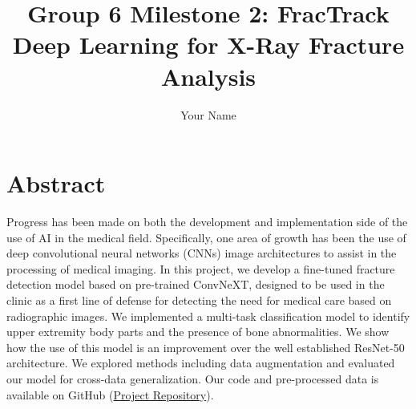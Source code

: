\documentclass[conference]{IEEEtran}
\begin{document}
\title{Group 6 Milestone 2: FracTrack\\[0.5em] 
       \large Deep Learning for X-Ray Fracture Analysis}
\author{Your Name}
\author{
\and
{}
\and
{}
\and
{}
}

\maketitle

\section{Abstract}
Progress has been made on both the development and implementation side of the use of AI in the medical field. Specifically, one area of growth has been the use of deep convolutional neural networks (CNNs) image architectures to assist in the processing of medical imaging. In this project, we develop a fine-tuned fracture detection model based on pre-trained ConvNeXT, designed to be used in the clinic as a first line of defense for detecting the need for medical care based on radiographic images. We implemented a multi-task classification model to identify upper extremity body parts and the presence of bone abnormalities. We show how the use of this model is an improvement over the well established ResNet-50 architecture. We explored methods including data augmentation and evaluated our model for cross-data generalization. Our code and pre-processed data is available on GitHub (\href{https://github.com/vatsa1617/ds_6050-003_project}{Project Repository}).
\end{document}
